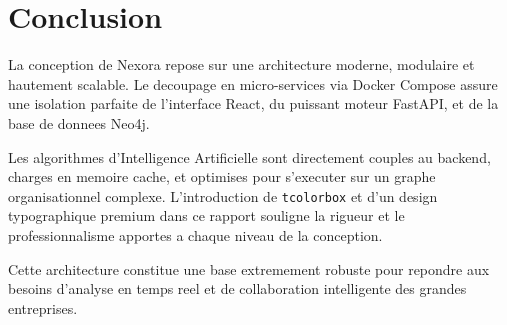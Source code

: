 \documentclass[12pt,a4paper]{article}
\begin{document}
\section{Conclusion}

La conception de Nexora repose sur une architecture moderne, modulaire et hautement scalable. Le decoupage en micro-services via Docker Compose assure une isolation parfaite de l'interface React, du puissant moteur FastAPI, et de la base de donnees Neo4j.

Les algorithmes d'Intelligence Artificielle sont directement couples au backend, charges en memoire cache, et optimises pour s'executer sur un graphe organisationnel complexe. L'introduction de \texttt{tcolorbox} et d'un design typographique premium dans ce rapport souligne la rigueur et le professionnalisme apportes a chaque niveau de la conception.

Cette architecture constitue une base extremement robuste pour repondre aux besoins d'analyse en temps reel et de collaboration intelligente des grandes entreprises.
\end{document}
